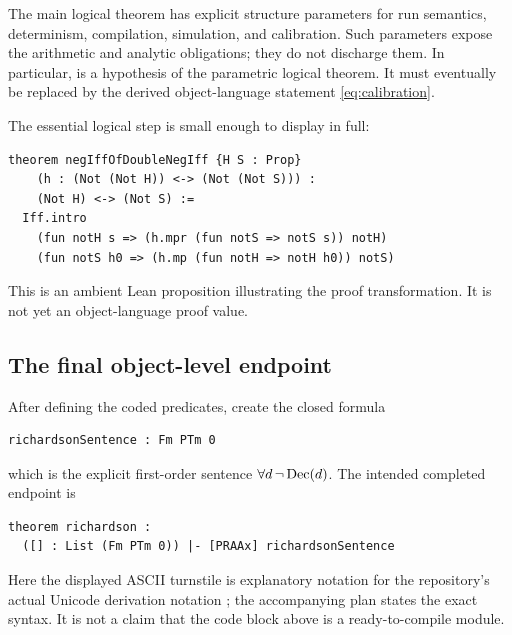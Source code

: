 The main logical theorem has explicit structure parameters for run
semantics, determinism, compilation, simulation, and calibration.
Such parameters expose the arithmetic and analytic obligations; they do
not discharge them. In particular,  is a
hypothesis of the parametric logical theorem. It must eventually be
replaced by the derived object-language statement
\eqref{eq:calibration}.

The essential logical step is small enough to display in full:
\begin{lstlisting}
theorem negIffOfDoubleNegIff {H S : Prop}
    (h : (Not (Not H)) <-> (Not (Not S))) :
    (Not H) <-> (Not S) :=
  Iff.intro
    (fun notH s => (h.mpr (fun notS => notS s)) notH)
    (fun notS h0 => (h.mp (fun notH => notH h0)) notS)
\end{lstlisting}
This is an ambient Lean proposition illustrating the proof transformation.
It is not yet an object-language proof value.

\subsection{The final object-level endpoint}

After defining the coded predicates, create the closed formula
\begin{lstlisting}
richardsonSentence : Fm PTm 0
\end{lstlisting}
which is the explicit first-order sentence
$\forall d\,\neg\operatorname{Dec}(d)$. The intended completed endpoint is
\begin{lstlisting}
theorem richardson :
  ([] : List (Fm PTm 0)) |- [PRAAx] richardsonSentence
\end{lstlisting}
Here the displayed ASCII turnstile is explanatory notation for the
repository's actual Unicode derivation notation
; the accompanying plan states the exact syntax.
It is not a claim that the code block above is a ready-to-compile module.

